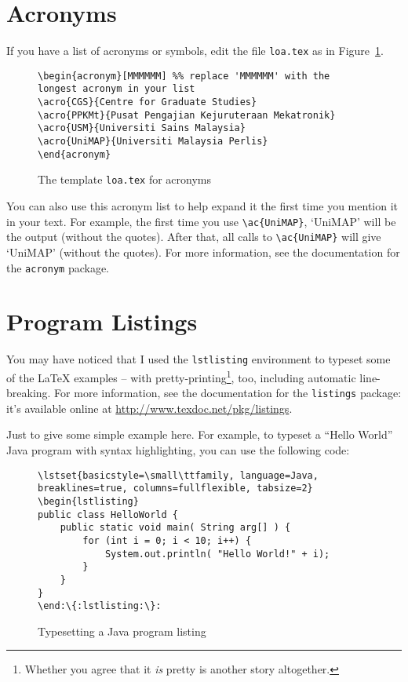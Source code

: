 \section{Acronyms}
\acresetall
If you have a list of acronyms or symbols, edit the file \verb|loa.tex| as in Figure~\ref{fig:acronym}.

\begin{figure}[hbt!]
\begin{lstlisting}
\begin{acronym}[MMMMMM] %% replace 'MMMMMM' with the longest acronym in your list
\acro{CGS}{Centre for Graduate Studies}
\acro{PPKMt}{Pusat Pengajian Kejuruteraan Mekatronik}
\acro{USM}{Universiti Sains Malaysia}
\acro{UniMAP}{Universiti Malaysia Perlis}
\end{acronym}
\end{lstlisting}
\caption{The template \texttt{loa.tex} for acronyms}\label{fig:acronym}
\end{figure}

You can also use this acronym list to help expand it the first time you mention it in your text.  For example, the first time you use \verb|\ac{UniMAP}|, `\ac{UniMAP}' will be the output (without the quotes).  After that, all calls to \verb|\ac{UniMAP}| will give `\ac{UniMAP}' (without the quotes).  For more information, see the documentation for the \texttt{acronym} package.

\section{Program Listings}

You may have noticed that I used the \verb|lstlisting| environment to typeset some of the \LaTeX{} examples -- with pretty-printing\footnote{Whether you agree that it \emph{is} pretty is another story altogether.}, too, including automatic line-breaking.  For more information, see the documentation for the \verb|listings| package: it's available online at \url{http://www.texdoc.net/pkg/listings}.

Just to give some simple example here.  For example, to typeset a ``Hello World'' Java program with syntax highlighting, you can use the following code:

\begin{figure}[hbt!]
\begin{lstlisting}[escapechar=:,language={}]
\lstset{basicstyle=\small\ttfamily, language=Java, breaklines=true, columns=fullflexible, tabsize=2}
\begin{lstlisting}
public class HelloWorld {
	public static void main( String arg[] ) {
        for (int i = 0; i < 10; i++) {
			System.out.println( "Hello World!" + i);
		}
	}
}
\end:\{:lstlisting:\}:
\end{lstlisting}
\caption{Typesetting a Java program listing}\label{fig:lst:syntax}
\end{figure}

